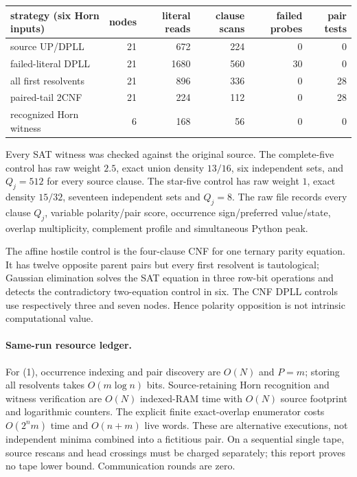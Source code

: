\documentclass[11pt]{article}
\begin{document}
\begin{center}
\begin{tabular}{lrrrrr}
\toprule
strategy (six Horn inputs)&nodes&literal reads&clause scans&failed probes&pair tests\\
\midrule
source UP/DPLL&21&672&224&0&0\\
failed-literal DPLL&21&1680&560&30&0\\
all first resolvents&21&896&336&0&28\\
paired-tail 2CNF&21&224&112&0&28\\
recognized Horn witness&6&168&56&0&0\\
\bottomrule
\end{tabular}
\end{center}
Every SAT witness was checked against the original source.  The complete-five
control has raw weight $2.5$, exact union density $13/16$, six independent
sets, and $Q_j=512$ for every source clause.  The star-five control has raw
weight $1$, exact density $15/32$, seventeen independent sets and $Q_j=8$.
The raw file records every clause $Q_j$, variable polarity/pair score,
occurrence sign/preferred value/state, overlap multiplicity, complement
profile and simultaneous Python peak.

The affine hostile control is the four-clause CNF for one ternary parity
equation.  It has twelve opposite parent pairs but every first resolvent is
tautological; Gaussian elimination solves the SAT equation in three row-bit
operations and detects the contradictory two-equation control in six.  The
CNF DPLL controls use respectively three and seven nodes.  Hence polarity
opposition is not intrinsic computational value.

\paragraph{Same-run resource ledger.}
For (1), occurrence indexing and pair discovery are $O(N)$ and $P=m$; storing
all resolvents takes $O(m\log n)$ bits.  Source-retaining Horn recognition and
witness verification are $O(N)$ indexed-RAM time with $O(N)$ source footprint
and logarithmic counters.  The explicit finite exact-overlap enumerator costs
$O(2^n m)$ time and $O(n+m)$ live words.  These are alternative executions,
not independent minima combined into a fictitious pair.  On a sequential
single tape, source rescans and head crossings must be charged separately;
this report proves no tape lower bound.  Communication rounds are zero.
\end{document}
